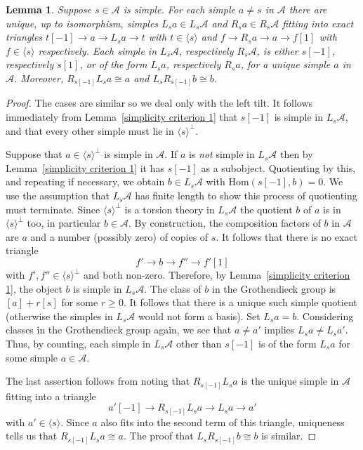 \documentclass{article}
\theoremstyle{plain}
\newtheorem{lemma}[theorem]{Lemma}     %
\theoremstyle{definition}
\theoremstyle{remark}
\newcommand{\cat}[1]{\mathcal{#1}}
\newcommand{\mor}[2]{{\mathrm{Hom}}(#1,#2)}
\begin{document}
\begin{lemma}
\label{simplicity criterion 2}
Suppose $s\in\cat{A}$ is simple. For each simple $a\neq s$ in $\cat{A}$ there are unique, up to isomorphism, simples $L_sa\in L_s\cat{A}$ and $R_sa\in R_s\cat{A}$ fitting into exact triangles $t[-1]\to a\to L_sa \to t$ with $t\in \langle s \rangle$ and $f\to R_sa\to a \to f[1]$ with $f\in \langle s \rangle$ respectively. Each simple in $L_s\cat{A}$, respectively $R_s\cat{A}$, is either $s[-1]$, respectively $s[1]$, or of the form $L_sa$, respectively $R_sa$, for a unique simple $a$ in $\cat{A}$. Moreover, $R_{s[-1]}L_sa\cong a$ and $L_sR_{s[-1]}b\cong b$.
\end{lemma}
\begin{proof}
The cases are similar so we deal only with the left tilt. It follows immediately from Lemma~\ref{simplicity criterion 1} that $s[-1]$ is simple in $L_s\cat{A}$, and that every other simple must lie in $\langle s \rangle^\perp$. 

Suppose that $a\in \langle s \rangle^\perp$ is simple in $\cat{A}$. If $a$ is {\em not} simple in $L_s\cat{A}$ then by Lemma~\ref{simplicity criterion 1} it has $s[-1]$ as a subobject. Quotienting by this, and repeating if necessary, we obtain $b\in L_s\cat{A}$ with $\mor{s[-1]}{b}=0$. We use the assumption that $L_s\cat{A}$ has finite length to show this process of quotienting must terminate.  Since $\langle s \rangle^\perp$ is a torsion theory in $L_s\cat{A}$ the quotient $b$ of $a$ is in $\langle s \rangle^\perp$ too, in particular $b\in \cat{A}$. By construction, the composition factors of $b$ in $\cat{A}$ are $a$ and a number (possibly zero) of copies of $s$. It follows that there is no exact triangle
$$
f' \to b\to f'' \to f'[1]
$$
with $f',f'' \in \langle s \rangle^\perp$ and both non-zero.  Therefore, by Lemma~\ref{simplicity criterion 1}, the object $b$ is simple in $L_s\cat{A}$. The class of $b$ in the Grothendieck group  is  $[a]+r[s]$ for some $r\geq 0$. It follows that there is a unique such simple quotient (otherwise the simples in  $L_s\cat{A}$ would not form a basis). Set  $L_sa=b$. Considering classes in the Grothendieck group again, we see that $a\neq a'$ implies $L_sa\neq L_sa'$. Thus, by counting, each simple in $L_s\cat{A}$ other than $s[-1]$ is of the form $L_sa$ for some simple $a\in \cat{A}$.  

The last assertion follows from noting that $R_{s[-1]}L_sa$ is the unique simple in $\cat{A}$ fitting into a triangle
$$
a' [-1]\to R_{s[-1]}L_sa\to L_sa \to a'
$$
with $a' \in \langle s\rangle$. Since $a$ also fits into the second term of this triangle, uniqueness tells us that $R_{s[-1]}L_sa\cong a$. The proof that $L_{s}R_{s[-1]}b\cong b$ is similar.
 \end{proof}
\end{document}
